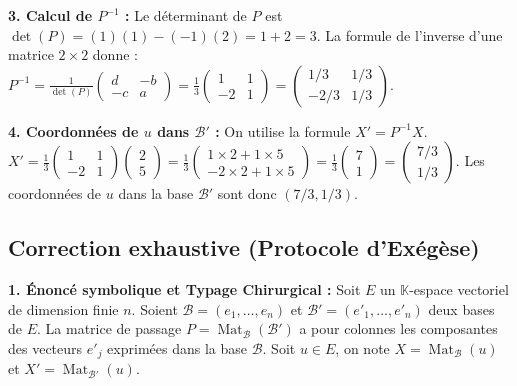 \documentclass{report}
\begin{document}
\textbf{3. Calcul de $P^{-1}$ :}
Le déterminant de $P$ est $\det(P) = (1)(1) - (-1)(2) = 1 + 2 = 3$.
La formule de l'inverse d'une matrice $2 \times 2$ donne :
$P^{-1} = \frac{1}{\det(P)} \begin{pmatrix} d & -b \\ -c & a \end{pmatrix} = \frac{1}{3} \begin{pmatrix} 1 & 1 \\ -2 & 1 \end{pmatrix} = \begin{pmatrix} 1/3 & 1/3 \\ -2/3 & 1/3 \end{pmatrix}$.

\textbf{4. Coordonnées de $u$ dans $\mathcal{B}'$ :}
On utilise la formule $X' = P^{-1} X$.
$X' = \frac{1}{3} \begin{pmatrix} 1 & 1 \\ -2 & 1 \end{pmatrix} \begin{pmatrix} 2 \\ 5 \end{pmatrix} = \frac{1}{3} \begin{pmatrix} 1 \times 2 + 1 \times 5 \\ -2 \times 2 + 1 \times 5 \end{pmatrix} = \frac{1}{3} \begin{pmatrix} 7 \\ 1 \end{pmatrix} = \begin{pmatrix} 7/3 \\ 1/3 \end{pmatrix}$.
Les coordonnées de $u$ dans la base $\mathcal{B}'$ sont donc $(7/3, 1/3)$.







\subsection*{Correction exhaustive (Protocole d'Exégèse)}

\textbf{1. Énoncé symbolique et Typage Chirurgical :}
Soit $E$ un $\mathbb{K}$-espace vectoriel de dimension finie $n$. Soient $\mathcal{B} = (e_1, \dots, e_n)$ et $\mathcal{B}' = (e'_1, \dots, e'_n)$ deux bases de $E$.
La matrice de passage $P = \operatorname{Mat}_{\mathcal{B}}(\mathcal{B}')$ a pour colonnes les composantes des vecteurs $e'_j$ exprimées dans la base $\mathcal{B}$.
Soit $u \in E$, on note $X = \operatorname{Mat}_{\mathcal{B}}(u)$ et $X' = \operatorname{Mat}_{\mathcal{B}'}(u)$.
\end{document}

